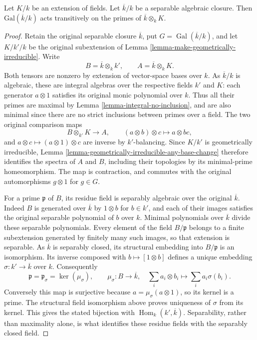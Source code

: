 \begin{lemma}
\label{lemma-Galois-orbit}
Let $K/k$ be an extension of fields.
Let $\overline{k}/k$ be a separable algebraic closure.
Then $\text{Gal}(\overline{k}/k)$ acts transitively on the
primes of $\overline{k} \otimes_k K$.
\end{lemma}

\begin{proof}
Retain the original separable closure
$\overline k$, put $G=\operatorname{Gal}(\overline k/k)$,
and let $K/k'/k$ be the original
subextension of Lemma
\ref{lemma-make-geometrically-irreducible}.
Write
$$
B=\overline k\otimes_k k',\qquad
A=\overline k\otimes_k K.
$$
Both tensors are nonzero by extension
of vector-space bases over $k$.
As $\overline k/k$ is algebraic,
these are integral algebras over
the respective fields $k'$ and
$K$: each generator $a\otimes1$
satisfies its original monic
polynomial over $k$. Thus all
their primes are maximal by
Lemma \ref{lemma-integral-no-inclusion},
and are also minimal since
there are no strict inclusions
between primes over a field.
The two original comparison maps
$$
B\otimes_{k'}K\longrightarrow A,
\qquad(a\otimes b)\otimes c\longmapsto a\otimes bc,
$$
and $a\otimes c\mapsto(a\otimes1)\otimes c$
are inverse by $k'$-balancing.
Since $K/k'$ is geometrically
irreducible, Lemma
\ref{lemma-geometrically-irreducible-any-base-change}
therefore identifies the spectra
of $A$ and $B$, including their
topologies by its minimal-prime
homeomorphism. The map is
contraction, and commutes with
the original automorphisms
$g\otimes1$ for $g\in G$.

For a prime $\mathfrak p$ of $B$,
its residue field is separably
algebraic over the original
$\overline k$. Indeed $B$ is
generated over $\overline k$ by
$1\otimes b$ for $b\in k'$,
and each of their images satisfies
the original separable polynomial
of $b$ over $k$. Minimal
polynomials over $\overline k$
divide these separable polynomials.
Every element of the field
$B/\mathfrak p$ belongs to a
finite subextension generated
by finitely many such images,
so that extension is separable.
As $\overline k$ is separably
closed, its structural embedding
into $B/\mathfrak p$ is an
isomorphism. Its inverse composed
with $b\mapsto[1\otimes b]$
defines a unique embedding
$\sigma:k'\to\overline k$ over $k$.
Consequently
$$
\mathfrak p=\mathfrak p_\sigma
=\ker(\mu_\sigma),\qquad
\mu_\sigma:B\to\overline k,\quad
\sum_i a_i\otimes b_i\longmapsto\sum_i a_i\sigma(b_i).
$$
Conversely this map is surjective
because $a=\mu_\sigma(a\otimes1)$,
so its kernel is a prime. The
structural field isomorphism
above proves uniqueness of
$\sigma$ from its kernel.
This gives the stated bijection
with $\operatorname{Hom}_k(k',\overline k)$.
Separability, rather than
maximality alone, is what
identifies these residue fields
with the separably closed field.


\end{proof}
